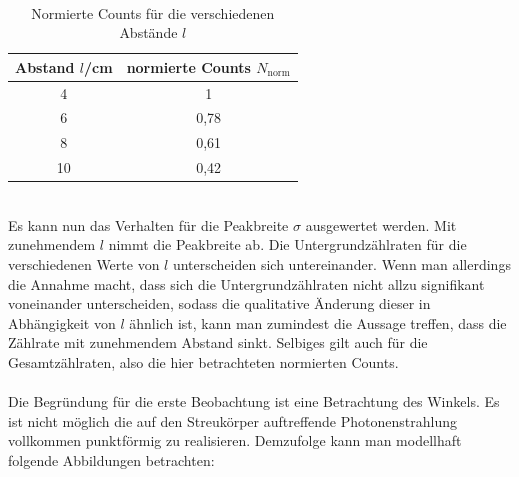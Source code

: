 \documentclass[german,  %
parskip=full,  %
]{scrartcl}
\begin{document}
\\
\begin{table}[h!]\centering
\begin{tabular}{|c|c|}\hline
Abstand $l$/cm & normierte Counts $N_{\text{norm}}$\\\hline
4  & 1	\\\hline
6   &  0,78	\\\hline
8   &  0,61	\\\hline
10   & 0,42	\\\hline
\end{tabular}
\caption{Normierte Counts für die verschiedenen Abstände $l$}
\end{table}
\\
Es kann nun das Verhalten für die Peakbreite $\sigma$ ausgewertet werden. Mit zunehmendem $l$ nimmt die Peakbreite ab. Die Untergrundzählraten für die verschiedenen Werte von $l$ unterscheiden sich untereinander. Wenn man allerdings die Annahme macht, dass sich die Untergrundzählraten nicht allzu signifikant voneinander unterscheiden, sodass die qualitative Änderung dieser in Abhängigkeit von $l$ ähnlich ist, kann man zumindest die Aussage treffen, dass die Zählrate mit zunehmendem Abstand sinkt. Selbiges gilt auch für die Gesamtzählraten, also die hier betrachteten normierten Counts.
\\\\
Die Begründung für die erste Beobachtung ist eine Betrachtung des Winkels. Es ist nicht möglich die auf den Streukörper auftreffende Photonenstrahlung vollkommen punktförmig zu realisieren. Demzufolge kann man modellhaft folgende Abbildungen betrachten:
\\
\end{document}
